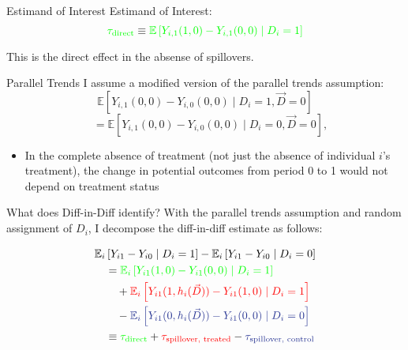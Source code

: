\documentclass[aspectratio=43]{beamer}
\begin{document}
\begin{frame}{Estimand of Interest}
    Estimand of Interest: \[ 
        \textcolor{green}{\tau_{\text{direct}}} \equiv \textcolor{green}{\mathbb{E}\left[ Y_{i,1}(1, 0) - Y_{i,1}(0, 0) \mid D_i = 1\right]}
    \]

    This is the direct effect in the absense of spillovers.
\end{frame}

\begin{frame}{Parallel Trends}
    I assume a modified version of the parallel trends assumption: 
    \[
        \mathbb{E}\left[ Y_{i,1}(0, 0) - Y_{i,0}(0, 0) \mid D_i = 1, \vec{D} = 0 \right] 
    \] \[
        \quad =
        \mathbb{E}\left[ Y_{i,1}(0, 0) - Y_{i,0}(0, 0) \mid D_i = 0, \vec{D} = 0 \right],
    \]

    \begin{itemize}
        \item In the complete absence of treatment (not just the absence of individual $i$'s treatment), the change in potential outcomes from period 0 to 1 would not depend on treatment status
    \end{itemize}
\end{frame}

\begin{frame}{What does Diff-in-Diff identify?}
    With the parallel trends assumption and random assignment of $D_i$, I decompose the diff-in-diff estimate as follows: 
        
    \begin{align*}
        &\mathbb{E}_i \left[ Y_{i1} - Y_{i0} \mid D_i = 1 \right] - \mathbb{E}_i \left[ Y_{i1} - Y_{i0} \mid D_i = 0 \right] \\
        &\quad = 
        \textcolor{green}{\mathbb{E}_i \left[ Y_{i1}(1, 0) - Y_{i1}(0, 0) \mid D_i = 1 \right]} \\
        &\quad\quad + 
        \textcolor{red}{\mathbb{E}_i \left[ Y_{i1}(1, h_i(\vec{D})) - Y_{i1}(1, 0) \mid D_i = 1 \right]} \\ 
        &\quad\quad - 
        \textcolor{purple}{\mathbb{E}_i \left[ Y_{i1}(0, h_i(\vec{D})) - Y_{i1}(0, 0) \mid D_i = 0 \right]} \\
        &\quad \equiv \textcolor{green}{\tau_{\text{direct}}} + \textcolor{red}{\tau_{\text{spillover, treated}}} - \textcolor{purple}{\tau_{\text{spillover, control}}}
    \end{align*}

\end{frame}
\end{document}
